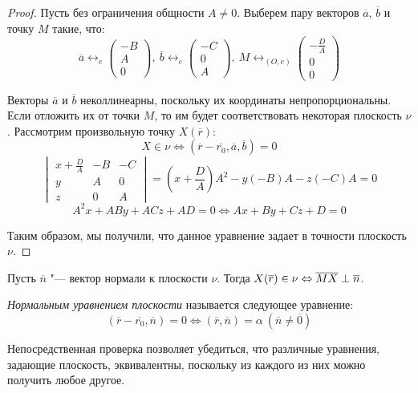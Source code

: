 \begin{proof}
	Пусть без ограничения общности $A \ne 0$. Выберем пару векторов $\overline{a}$, $\overline{b}$ и точку $M$ такие, что: \[\overline{a} \leftrightarrow_{e} \begin{pmatrix}-B\\A\\0\end{pmatrix},~\overline{b} \leftrightarrow_{e} \begin{pmatrix}-C\\0\\A\end{pmatrix},~M \leftrightarrow_{(O, e)} \begin{pmatrix}-\frac{D}{A}\\0\\0\end{pmatrix}\]
	
	Векторы $\overline{a}$ и $\overline{b}$ неколлинеарны, поскольку их координаты непропорциональны. Если отложить их от точки $M$, то им будет соответствовать некоторая плоскость $\nu$. Рассмотрим произвольную точку $X(\overline{r})$:
	\[X \in \nu \Leftrightarrow (\overline{r} - \overline{r_0}, \overline{a}, \overline{b}) = 0\]
	\[\begin{vmatrix}
	x + \frac{D}{A} & -B & -C\\
	y & A & 0\\
	z & 0 & A
	\end{vmatrix} = (x + \frac{D}{A})A^2 - y(-B)A - z(-C)A = 0\]
	\[A^2x + ABy + ACz + AD = 0 \Leftrightarrow Ax + By + Cz + D = 0\]
	
	Таким образом, мы получили, что данное уравнение задает в точности плоскость $\nu$.
\end{proof}

Пусть $\overline{n}$ "--- вектор нормали к плоскости $\nu$. Тогда $X (\overline{r}) \in \nu \hm{\Leftrightarrow} \overline{MX} \perp \overline{n}$.

\begin{definition}
	\textit{Нормальным уравнением плоскости} называется следующее уравнение:
	\[(\overline{r} - \overline{r_0}, \overline{n}) = 0 \Leftrightarrow (\overline{r}, \overline{n}) = \alpha~(\overline{n} \ne \overline{0})\]
\end{definition}

\begin{note}
	Непосредственная проверка позволяет убедиться, что различные уравнения, задающие плоскость, эквивалентны, поскольку из каждого из них можно получить любое другое.
\end{note}

